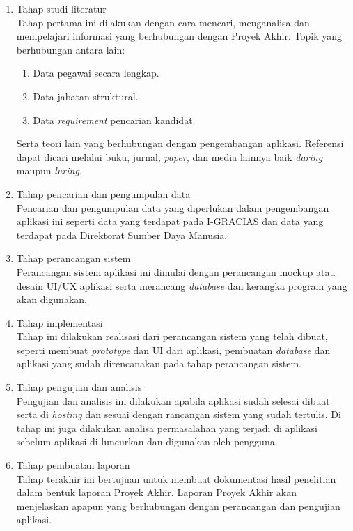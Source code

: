 \begin{enumerate}
	\item Tahap studi literatur \\
	Tahap pertama ini dilakukan dengan cara mencari, menganalisa dan mempelajari informasi yang berhubungan dengan Proyek Akhir. Topik yang berhubungan antara lain: 
	\begin{enumerate}
	\item Data pegawai secara lengkap.
	\item Data jabatan struktural.
	\item Data \textit{requirement} pencarian kandidat. 
	\end{enumerate}
	Serta teori lain yang berhubungan dengan pengembangan aplikasi. Referensi dapat dicari melalui buku, jurnal, \textit{paper}, dan media lainnya baik \textit{daring} maupun \textit{luring}.
	\item	Tahap pencarian dan pengumpulan data \\
	Pencarian dan pengumpulan data yang diperlukan dalam pengembangan aplikasi ini seperti data yang terdapat pada I-GRACIAS dan data yang terdapat pada Direktorat Sumber Daya Manusia.
	\\
	\item	Tahap perancangan sistem \\
	Perancangan sistem aplikasi ini dimulai dengan perancangan mockup atau desain UI/UX aplikasi serta merancang \textit{database} dan kerangka program yang akan digunakan.
	\item Tahap implementasi \\
	Tahap ini dilakukan realisasi dari perancangan sistem yang telah dibuat, seperti membuat \textit{prototype} dan UI dari aplikasi, pembuatan \textit{database} dan aplikasi yang sudah direncanakan pada tahap perancangan sistem.
	\item Tahap pengujian dan analisis \\
	Pengujian dan analisis ini dilakukan apabila aplikasi sudah selesai dibuat serta di \textit{hosting} dan sesuai dengan rancangan sistem yang sudah tertulis. Di tahap ini juga dilakukan analisa permasalahan yang terjadi di aplikasi sebelum aplikasi di luncurkan dan digunakan oleh pengguna.
	\item	Tahap pembuatan laporan \\
	Tahap terakhir ini bertujuan untuk membuat dokumentasi hasil penelitian dalam bentuk laporan Proyek Akhir. Laporan Proyek Akhir akan menjelaskan apapun yang berhubungan dengan perancangan dan pengujian aplikasi.  
	
\end{enumerate}


